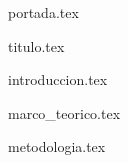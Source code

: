 \documentclass[a4paper, 12pt, twoside]{article}
\begin{document}
{portada.tex}

\tableofcontents

\clearpage

{titulo.tex}

{introduccion.tex}

{marco_teorico.tex}

{metodologia.tex}

\clearpage

% 


\end{document}
